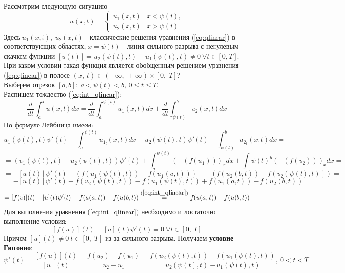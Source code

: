 \documentclass[14pt]{article}
\begin{document}
 \noindent Рассмотрим следующую ситуацию:
\newline
\newline
\begin{equation}\label{eq:u_cases}
    u(x,t) = 
    \begin{cases}
        u_{1}(x, t) & x < \psi(t) ,\\
        u_{2}(x,t) & x > \psi(t)
    \end{cases}
\end{equation}
Здесь $u_{1}(x,t), \ u_{2}(x,t)$ - классические решения уравнения (\ref{eq:qlinear}) в соответствующих областях, $x = \psi (t)$ - линия сильного разрыва с ненулевым скачком функции $[u(t)] = u_{2}(\psi (t),t) - u_{1}(\psi (t), t) \neq 0 \ \forall t \in [0, T]$.
\newline
При каком условии такая функция является обобщенным решением уравнения (\ref{eq:qlinear}) в полосе $(x,\;t) \in (-\infty,\;+\infty) \times [0,\;T]$?
\\Выберем отрезок $[a, b]: \ a < \psi (t) < b, \ 0 \leq t \leq T.$
\\ Распишем тождество (\ref{eq:int_qlinear}):
$$
    \frac{d}{dt}\int_{a}^{b} u(x,t)dx = \frac{d}{dt} \int_{a}^{\psi (t)} u_{1}(x,t) dx + \frac{d}{dt} \int_{\psi(t)}^{b} u_{2}(x, t) dx
$$
По формуле Лейбница имеем:
$$
    u_{1}(\psi(t),t)\psi'(t) + \int_{a}^{\psi(t)} u_{1_{t}}(x,t)dx - 
    u_{2}(\psi(t),t)\psi'(t) + \int_{\psi(t)}^{b} u_{2_{t}}(x,t)dx =
$$
$$
     = (u_{1}(\psi(t),t) - u_{2}(\psi(t),t))\psi'(t)
     + \int_{a}^{\psi(t)} (-(f(u_1)))_{x} dx
     + \int{\psi(t)}^{b} (-(f(u_2)))_{x} dx =
$$
$$
    = -[u(t)]\psi'(t)- (f(u_{1}(\psi(t),t)) - f(u_{1}(a,t))) - 
    - (f(u_{2}(b,t)) - f(u_{2}(\psi(t),t))) = 
$$
$$
    = -[u(t)]\psi'(t) + f(u_{2}(\psi(t), t)) - f(u_1(\psi(t),t)) + 
    f(u_{1}(a,t))-f(u_{2}(b,t))=
$$
$$
        = [f(u)](t) - [u](t)\psi'(t) + f(u(a,t)) - f(u(b,t))\stackrel{(\ref{eq:int_qlinear})}{=}
        f(u(a,t)) - f(u(b,t))
$$
Для выполнения уравнения (\ref{eq:int_qlinear}) необходимо и лостаточно выполнение условия:
$$
    [f(u)](t) - [u](t)\psi'(t) = 0 \ \forall t \in [0, \ T]
$$
Причем $[u](t) \neq 0 \ t \in [0, \; T]$ из-за сильного разрыва.
\newline
\newline
Получаем \textbf{условие Гюгонио}:
\begin{equation}\label{eq:gugonio}
    \psi'(t) = \frac{[f(u)](t)}{[u](t)} = \frac{f(u_2) - f(u_1)}{u_2-u_1}=
    \frac{f(u_{2}(\psi(t),t)) - f(u_{1}(\psi(t), t))}{u_{2}(\psi(t),t)-u_{1}(\psi(t), t)},
    \; 0<t<T
\end{equation}
\end{document}
